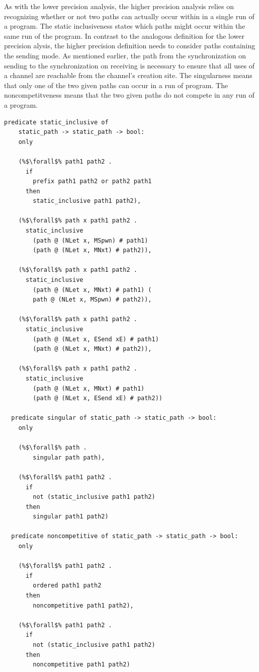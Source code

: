 \documentclass{article}
\begin{document}
As with the lower precision analysis, the higher precision analysis relies on recognizing
whether or not two paths can actually occur within in a single run of a program. The static
inclusiveness states which paths might occur within the same run of the program.
In contrast to the analogous definition for the lower precision
alysis, the higher precision definition needs to consider paths containing the
sending mode.  As mentioned earlier, the path from the synchronization on sending to the
synchronization on receiving is necessary to ensure that all uses of a channel are reachable
from the channel's creation site.  The singularness means that only one of the two
given paths can occur in a run of program.  The noncompetitveness means that the two
given paths do not compete in any run of a program. 

\begin{lstlisting}[language=logic, escapechar=\%]
  predicate static_inclusive of
    static_path -> static_path -> bool:
    only

    (%$\forall$% path1 path2 .
      if
        prefix path1 path2 or path2 path1
      then
        static_inclusive path1 path2),

    (%$\forall$% path x path1 path2 .
      static_inclusive
        (path @ (NLet x, MSpwn) # path1)
        (path @ (NLet x, MNxt) # path2)),

    (%$\forall$% path x path1 path2 .
      static_inclusive
        (path @ (NLet x, MNxt) # path1) (
        path @ (NLet x, MSpwn) # path2)),

    (%$\forall$% path x path1 path2 .
      static_inclusive
        (path @ (NLet x, ESend xE) # path1)
        (path @ (NLet x, MNxt) # path2)),

    (%$\forall$% path x path1 path2 .
      static_inclusive
        (path @ (NLet x, MNxt) # path1)
        (path @ (NLet x, ESend xE) # path2))

  predicate singular of static_path -> static_path -> bool:
    only 

    (%$\forall$% path .
        singular path path),

    (%$\forall$% path1 path2 .
      if
        not (static_inclusive path1 path2)
      then
        singular path1 path2)

  predicate noncompetitive of static_path -> static_path -> bool:
    only

    (%$\forall$% path1 path2 . 
      if
        ordered path1 path2
      then
        noncompetitive path1 path2),

    (%$\forall$% path1 path2 .
      if
        not (static_inclusive path1 path2)
      then
        noncompetitive path1 path2)
  \end{lstlisting}
\end{document}
